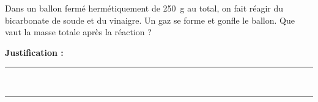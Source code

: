 Dans un ballon fermé hermétiquement de \qty{250}{g} au total, on fait réagir du bicarbonate de soude et du vinaigre. Un gaz se forme et gonfle le ballon. Que vaut la masse totale après la réaction ?

\choices

\noindent\textbf{Justification :} \hrulefill \\[2.5ex]
\rule{\linewidth}{0.4pt} \\[2.5ex]
\rule{\linewidth}{0.4pt}
\vfill
